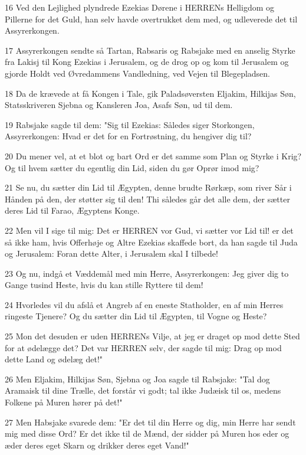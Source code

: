 \par 16 Ved den Lejlighed plyndrede Ezekias Dørene i HERRENs Helligdom og Pillerne for det Guld, han selv havde overtrukket dem med, og udleverede det til Assyrerkongen.
\par 17 Assyrerkongen sendte så Tartan, Rabsaris og Rabsjake med en anselig Styrke fra Lakisj til Kong Ezekias i Jerusalem, og de drog op og kom til Jerusalem og gjorde Holdt ved Øvredammens Vandledning, ved Vejen til Blegepladsen.
\par 18 Da de krævede at få Kongen i Tale, gik Paladsøversten Eljakim, Hilkijas Søn, Statsskriveren Sjebna og Kansleren Joa, Asafs Søn, ud til dem.
\par 19 Rabsjake sagde til dem: "Sig til Ezekias: Således siger Storkongen, Assyrerkongen: Hvad er det for en Fortrøstning, du hengiver dig til?
\par 20 Du mener vel, at et blot og bart Ord er det samme som Plan og Styrke i Krig? Og til hvem sætter du egentlig din Lid, siden du gør Oprør imod mig?
\par 21 Se nu, du sætter din Lid til Ægypten, denne brudte Rørkæp, som river Sår i Hånden på den, der støtter sig til den! Thi således går det alle dem, der sætter deres Lid til Farao, Ægyptens Konge.
\par 22 Men vil I sige til mig: Det er HERREN vor Gud, vi sætter vor Lid til! er det så ikke ham, hvis Offerhøje og Altre Ezekias skaffede bort, da han sagde til Juda og Jerusalem: Foran dette Alter, i Jerusalem skal I tilbede!
\par 23 Og nu, indgå et Væddemål med min Herre, Assyrerkongen: Jeg giver dig to Gange tusind Heste, hvis du kan stille Ryttere til dem!
\par 24 Hvorledes vil du afslå et Angreb af en eneste Statholder, en af min Herres ringeste Tjenere? Og du sætter din Lid til Ægypten, til Vogne og Heste?
\par 25 Mon det desuden er uden HERRENs Vilje, at jeg er draget op mod dette Sted for at ødelægge det? Det var HERREN selv, der sagde til mig: Drag op mod dette Land og ødelæg det!"
\par 26 Men Eljakim, Hilkijas Søn, Sjebna og Joa sagde til Rabsjake: "Tal dog Aramaisk til dine Trælle, det forstår vi godt; tal ikke Judæisk til os, medens Folkene på Muren hører på det!"
\par 27 Men Habsjake svarede dem: "Er det til din Herre og dig, min Herre har sendt mig med disse Ord? Er det ikke til de Mænd, der sidder på Muren hos eder og æder deres eget Skarn og drikker deres eget Vand!"
